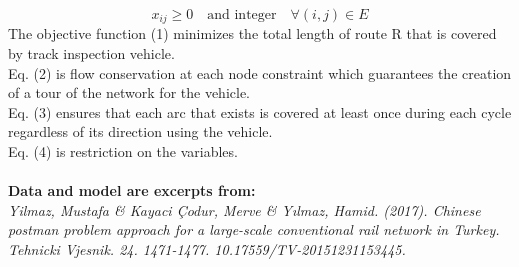 \documentclass[a4paper,12pt,titlepage]{article}
\begin{document}
\begin{equation}
x_{ij}\geq0 \quad \text{and integer} \quad \forall (i,j)\in E
\end{equation}
\newpage
The objective function (1) minimizes the total length of route R that is covered by track inspection vehicle. \\
Eq. (2) is flow conservation at each node constraint which guarantees the creation of a tour of the network for the vehicle. \\
Eq. (3) ensures that each arc that exists is covered at least once during each cycle regardless of its direction using the vehicle. \\
Eq. (4) is restriction on the variables.\\
\\
\small{\textbf{Data and model are excerpts from:}\\
	\textit{Yilmaz, Mustafa \& Kayaci Çodur, Merve \& Yılmaz, Hamid. (2017). Chinese postman problem approach for a large-scale conventional rail network in Turkey. Tehnicki Vjesnik. 24. 1471-1477. 10.17559/TV-20151231153445.}}
\end{document}
